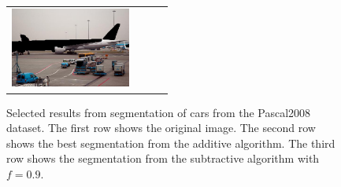 \documentclass[10pt,twocolumn,letterpaper]{article}
\begin{document}
\begin{figure}[p]
\begin{tabular}{ p{4cm} p{4cm} p{4cm} p{4cm} }
\includegraphics[width=3.95cm]{figures/add_res/plane/2008_003673.jpg_2_bad.jpg.eps} \\
\end{tabular}
\caption{Selected results from segmentation of cars from the Pascal2008
dataset.  The first row shows the original image.  The second row shows
the best segmentation from the additive algorithm.  The third row shows
the segmentation from the subtractive algorithm with $f=0.9$.}
\label{fig:good_results_car}
\end{figure}
\end{document}
